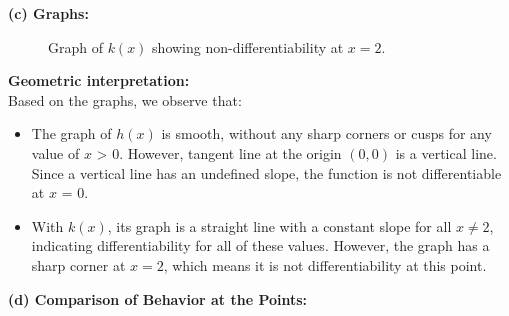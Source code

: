 \textbf{(c) Graphs:}
    \begin{figure}[H]
    \centering
    \begin{minipage}{0.48\textwidth}
        \centering
        \caption{Graph of $h(x)$ showing non-differentiability at $x=0$.}
        \label{fig:h_graph_tikz}
    \end{minipage}%
    \hfill%
    \begin{minipage}{0.48\textwidth}
        \centering
        \caption{Graph of $k(x)$ showing non-differentiability at $x=2$.}
        \label{fig:k_graph_tikz}
    \end{minipage}
    \end{figure}
    \vspace{0.5cm}
    \textbf{Geometric interpretation:} \\
    Based on the graphs, we observe that: 
        \begin{itemize} 
        \item The graph of $h(x)$ is smooth, without any sharp corners or cusps for any value of $x$ > 0. However, tangent line at the origin \((0,0)\) is a vertical line. Since a vertical line has an undefined slope, the function is not differentiable at $x$ = 0.
        \item With $k(x)$, its graph is a straight line with a constant slope for all $x \neq 2$, indicating differentiability for all of these values. However, the graph has a sharp corner at \(x=2\), which means it is not differentiability at this point.
        \end{itemize}
\textbf{(d) Comparison of Behavior at the Points:}

